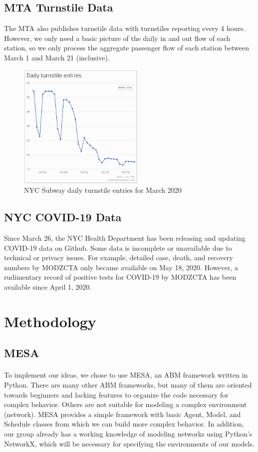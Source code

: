 \documentclass[12pt, a4, epsf] {article}
\theoremstyle{plain}
\theoremstyle{definition}
\begin{document}
\subsection{MTA Turnstile Data \cite{mta_turnstiles}}
The MTA also publishes turnstile data with turnstiles reporting every 4 hours. However, we only need a basic picture of the daily in and out flow of each station, so we only process the aggregate passenger flow of each station between March 1 and March 21 (inclusive). 
\begin{figure}
    \includegraphics[width=6cm]{Scratch_Visuals/schneider_ridership.png}
    \caption{NYC Subway daily turnstile entries for March 2020 \cite{toddwschneider}}
\end{figure}
\subsection{NYC COVID-19 Data}
Since March 26, the NYC Health Department has been releasing and updating COVID-19 data on Github\cite{nychealth_2020}. Some data is incomplete or unavailable due to technical or privacy issues. For example, detailed case, death, and recovery numbers by MODZCTA only became available on May 18, 2020. However, a rudimentary record of positive tests for COVID-19 by MODZCTA has been available since April 1, 2020.
\section{Methodology}
\subsection{MESA\cite{Mesa}}
\paragraph{}
To implement our ideas, we chose to use MESA, an ABM framework written in Python. There are many other ABM frameworks, but many of them are oriented towards beginners and lacking features to organize the code necessary for complex behavior. Others are not suitable for modeling a complex environment (network). MESA provides a simple framework with basic Agent, Model, and Schedule classes from which we can build more complex behavior. In addition, our group already has a working knowledge of modeling networks using Python's NetworkX\cite{hagberg-2008-exploring}, which will be necessary for specifying the environments of our models.
\end{document}
